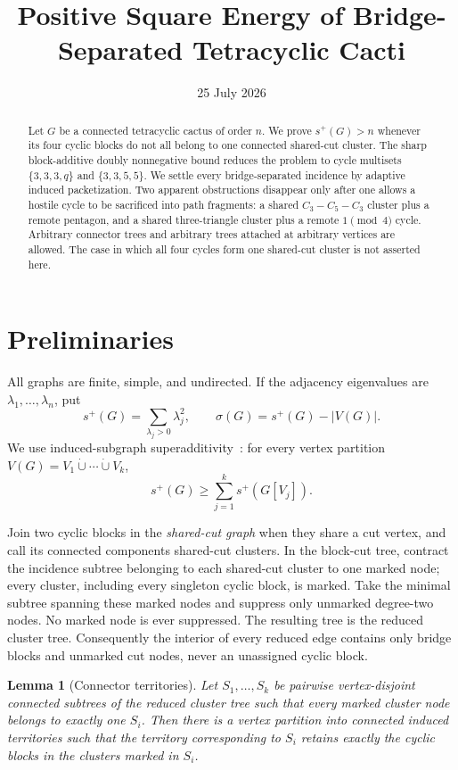 \documentclass[11pt]{article}
\title{Positive Square Energy of Bridge-Separated Tetracyclic Cacti}
\author{}
\date{25 July 2026}
\newtheorem{lemma}[theorem]{Lemma}
\newcommand{\spE}{s^+}
\newcommand{\sig}{\sigma}
\begin{document}
\maketitle

\begin{abstract}
Let $G$ be a connected tetracyclic cactus of order $n$.  We prove
$s^+(G)>n$ whenever its four cyclic blocks do not all belong to one connected
shared-cut cluster.  The sharp block-additive doubly nonnegative bound reduces
the problem to cycle multisets $\{3,3,3,q\}$ and
$\{3,3,5,5\}$.  We settle every bridge-separated incidence by adaptive
induced packetization.  Two apparent obstructions disappear only after one
allows a hostile cycle to be sacrificed into path fragments: a shared
$C_3-C_5-C_3$ cluster plus a remote pentagon, and a shared three-triangle
cluster plus a remote $1\pmod4$ cycle.  Arbitrary connector trees and arbitrary
trees attached at arbitrary vertices are allowed.  The case in which all four
cycles form one shared-cut cluster is not asserted here.
\end{abstract}

\section{Preliminaries}

All graphs are finite, simple, and undirected.  If the adjacency eigenvalues
are $\lambda_1,\ldots,\lambda_n$, put
\[
 \spE(G)=\sum_{\lambda_j>0}\lambda_j^2,
 \qquad \sig(G)=\spE(G)-|V(G)|.
\]
We use induced-subgraph superadditivity~\cite{AKMP}: for every vertex partition
$V(G)=V_1\dot\cup\cdots\dot\cup V_k$,
\begin{equation}\label{eq:super}
 \spE(G)\geq\sum_{j=1}^k\spE(G[V_j]).
\end{equation}

Join two cyclic blocks in the \emph{shared-cut graph} when they share a cut
vertex, and call its connected components shared-cut clusters.  In the
block-cut tree, contract the incidence subtree belonging to each shared-cut
cluster to one marked node; every cluster, including every singleton cyclic
block, is marked.  Take the minimal subtree spanning these marked nodes and
suppress only unmarked degree-two nodes.  No marked node is ever suppressed.
The resulting tree is the reduced cluster tree.  Consequently the interior of
every reduced edge contains only bridge blocks and unmarked cut nodes, never an
unassigned cyclic block.

\begin{lemma}[Connector territories]\label{lem:territories}
Let $S_1,\ldots,S_k$ be pairwise vertex-disjoint connected subtrees of the
reduced cluster tree such that every marked cluster node belongs to exactly one
$S_i$.  Then there is a vertex partition into connected induced territories
such that the territory corresponding to $S_i$ retains exactly the cyclic
blocks in the clusters marked in $S_i$.
\end{lemma}
\end{document}
